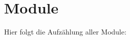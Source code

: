 \section{Module}
Hier folgt die Aufzählung aller Module\+:\begin{DoxyCompactList}
\item {}
\begin{DoxyCompactList}
\item {}
\begin{DoxyCompactList}
\item {}
\end{DoxyCompactList}
\end{DoxyCompactList}
\end{DoxyCompactList}
